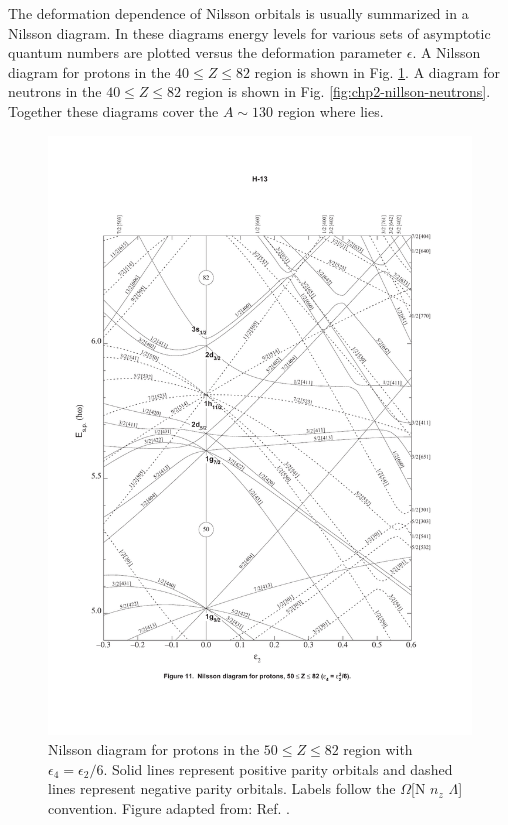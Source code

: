 The deformation dependence of Nilsson orbitals is usually summarized in a Nilsson diagram. In these diagrams energy levels for various sets of asymptotic quantum numbers are plotted versus the deformation parameter $\epsilon$. A Nilsson diagram for protons in the $40\leq{}Z\leq82$ region is shown in Fig. \ref{fig:chp2-nillson-protons}. A diagram for neutrons in the $40\leq{}Z\leq82$ region is shown in Fig. \ref{fig:chp2-nillson-neutrons}. Together these diagrams cover the $A\sim 130$ region where \pr{} lies.

\begin{figure}[h!]
\centerline{\includegraphics[height=0.8\textheight,clip=true,trim=10 100 10 100]{./img/c2/nilsson_proton_diagram.pdf}}
	\caption{Nilsson diagram for protons in the $50\leq Z \leq 82$ region with $\epsilon_4=\epsilon_2/6$. Solid lines represent positive parity orbitals and dashed lines represent negative parity orbitals. Labels follow the $\Omega$[N $n_z$ $\Lambda$] convention. Figure adapted from: Ref. \cite{nilssonDiagrams}.\label{fig:chp2-nillson-protons}}
\end{figure}

